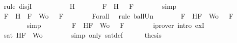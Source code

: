 \begin{isabellebody}
\ {\isacharparenleft}rule\ disjI{}{\isacharparenright}\isanewline
\ \ \isamarkupfalse%
\isanewline
\ \ \ \ \isamarkupfalse%
\ {\isachardoublequoteopen}{\isasymA}\ {\isasymTurnstile}\ H{\isachardoublequoteclose}\isanewline
\ \ \ \ \isamarkupfalse%
\ \isamarkupfalse%
\ {\isachardoublequoteopen}{\isasymforall}F\ {\isasymin}\ {\isacharbraceleft}H{\isacharbraceright}{\isachardot}\ {\isasymA}\ {\isasymTurnstile}\ F{\isachardoublequoteclose}\isanewline
\ \ \ \ \ \ \isamarkupfalse%
\ simp\isanewline
\ \ \ \ \isamarkupfalse%
\ \isamarkupfalse%
\ {\isachardoublequoteopen}{\isasymforall}F\ {\isasymin}\ {\isacharparenleft}{\isacharbraceleft}H{\isacharbraceright}\ {\isasymunion}\ {\isacharparenleft}{\isacharbraceleft}F{\isacharbraceright}\ {\isasymunion}\ Wo{\isacharparenright}{\isacharparenright}{\isachardot}\ {\isasymA}\ {\isasymTurnstile}\ F{\isachardoublequoteclose}\isanewline
\ \ \ \ \ \ \isamarkupfalse%
\ Forall{}\ \isamarkupfalse%
\ {\isacharparenleft}rule\ ball{\isacharunderscore}Un{\isacharparenright}\isanewline
\ \ \ \ \isamarkupfalse%
\ \isamarkupfalse%
\ {\isachardoublequoteopen}{\isasymforall}F\ {\isasymin}\ {\isacharbraceleft}H{\isacharcomma}F{\isacharbraceright}\ {\isasymunion}\ Wo{\isachardot}\ {\isasymA}\ {\isasymTurnstile}\ F{\isachardoublequoteclose}\isanewline
\ \ \ \ \ \ \isamarkupfalse%
\ simp\isanewline
\ \ \ \ \isamarkupfalse%
\ \isamarkupfalse%
\ {\isachardoublequoteopen}{\isasymexists}{\isasymA}{\isachardot}\ {\isasymforall}F\ {\isasymin}\ {\isacharparenleft}{\isacharbraceleft}H{\isacharcomma}F{\isacharbraceright}\ {\isasymunion}\ Wo{\isacharparenright}{\isachardot}\ {\isasymA}\ {\isasymTurnstile}\ F{\isachardoublequoteclose}\isanewline
\ \ \ \ \ \ \isamarkupfalse%
\ {\isacharparenleft}iprover\ intro{\isacharcolon}\ exI{\isacharparenright}\isanewline
\ \ \ \ \isamarkupfalse%
\ \isamarkupfalse%
\ {\isachardoublequoteopen}sat\ {\isacharparenleft}{\isacharbraceleft}H{\isacharcomma}F{\isacharbraceright}\ {\isasymunion}\ Wo{\isacharparenright}{\isachardoublequoteclose}\isanewline
\ \ \ \ \ \ \isamarkupfalse%
\ {\isacharparenleft}simp\ only{\isacharcolon}\ sat{\isacharunderscore}def{\isacharparenright}\isanewline
\ \ \ \ \isamarkupfalse%
\ {\isacharquery}thesis\isanewline
\ \ \ \ \ \ \isamarkupfalse%

\end{isabellebody}
